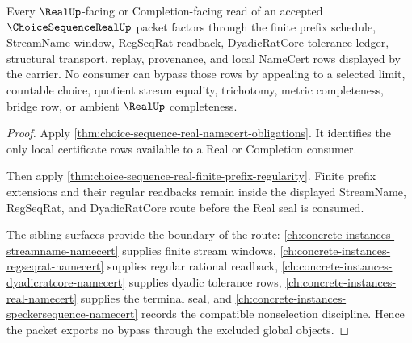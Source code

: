 \begin{theorem}
\label{thm:choice-sequence-real-nonescape}
Every $\RealUp$-facing or Completion-facing read of an accepted $\ChoiceSequenceRealUp$ packet factors through the finite prefix schedule, StreamName window, RegSeqRat readback, DyadicRatCore tolerance ledger, structural transport, replay, provenance, and local NameCert rows displayed by the carrier. No consumer can bypass those rows by appealing to a selected limit, countable choice, quotient stream equality, trichotomy, metric completeness, bridge row, or ambient $\RealUp$ completeness.
\end{theorem}
\begin{proof}
Apply \autoref{thm:choice-sequence-real-namecert-obligations}. It identifies the only local certificate rows available to a Real or Completion consumer.

Then apply \autoref{thm:choice-sequence-real-finite-prefix-regularity}. Finite prefix extensions and their regular readbacks remain inside the displayed StreamName, RegSeqRat, and DyadicRatCore route before the Real seal is consumed.

The sibling surfaces provide the boundary of the route: \autoref{ch:concrete-instances-streamname-namecert} supplies finite stream windows, \autoref{ch:concrete-instances-regseqrat-namecert} supplies regular rational readback, \autoref{ch:concrete-instances-dyadicratcore-namecert} supplies dyadic tolerance rows, \autoref{ch:concrete-instances-real-namecert} supplies the terminal seal, and \autoref{ch:concrete-instances-speckersequence-namecert} records the compatible nonselection discipline. Hence the packet exports no bypass through the excluded global objects.
\end{proof}


\begin{closurestatus}{\ChoiceSequenceRealUp}
  \theoryclosure{\seedClosure}
  \formalstatus{\unformalizedV}
\end{closurestatus}
